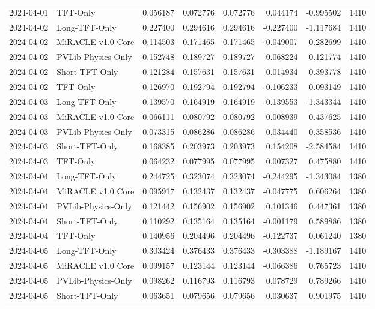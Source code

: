 \begin{tabular}{llrrrrrr}
2024-04-01 & TFT-Only & 0.056187 & 0.072776 & 0.072776 & 0.044174 & -0.995502 & 1410 \\
2024-04-02 & Long-TFT-Only & 0.227400 & 0.294616 & 0.294616 & -0.227400 & -1.117684 & 1410 \\
2024-04-02 & MiRACLE v1.0 Core & 0.114503 & 0.171465 & 0.171465 & -0.049007 & 0.282699 & 1410 \\
2024-04-02 & PVLib-Physics-Only & 0.152748 & 0.189727 & 0.189727 & 0.068224 & 0.121774 & 1410 \\
2024-04-02 & Short-TFT-Only & 0.121284 & 0.157631 & 0.157631 & 0.014934 & 0.393778 & 1410 \\
2024-04-02 & TFT-Only & 0.126970 & 0.192794 & 0.192794 & -0.106233 & 0.093149 & 1410 \\
2024-04-03 & Long-TFT-Only & 0.139570 & 0.164919 & 0.164919 & -0.139553 & -1.343344 & 1410 \\
2024-04-03 & MiRACLE v1.0 Core & 0.066111 & 0.080792 & 0.080792 & 0.008939 & 0.437625 & 1410 \\
2024-04-03 & PVLib-Physics-Only & 0.073315 & 0.086286 & 0.086286 & 0.034440 & 0.358536 & 1410 \\
2024-04-03 & Short-TFT-Only & 0.168385 & 0.203973 & 0.203973 & 0.154208 & -2.584584 & 1410 \\
2024-04-03 & TFT-Only & 0.064232 & 0.077995 & 0.077995 & 0.007327 & 0.475880 & 1410 \\
2024-04-04 & Long-TFT-Only & 0.244725 & 0.323074 & 0.323074 & -0.244295 & -1.343084 & 1380 \\
2024-04-04 & MiRACLE v1.0 Core & 0.095917 & 0.132437 & 0.132437 & -0.047775 & 0.606264 & 1380 \\
2024-04-04 & PVLib-Physics-Only & 0.121442 & 0.156902 & 0.156902 & 0.101346 & 0.447361 & 1380 \\
2024-04-04 & Short-TFT-Only & 0.110292 & 0.135164 & 0.135164 & -0.001179 & 0.589886 & 1380 \\
2024-04-04 & TFT-Only & 0.140956 & 0.204496 & 0.204496 & -0.122737 & 0.061240 & 1380 \\
2024-04-05 & Long-TFT-Only & 0.303424 & 0.376433 & 0.376433 & -0.303388 & -1.189167 & 1410 \\
2024-04-05 & MiRACLE v1.0 Core & 0.099157 & 0.123144 & 0.123144 & -0.066386 & 0.765723 & 1410 \\
2024-04-05 & PVLib-Physics-Only & 0.098262 & 0.116793 & 0.116793 & 0.078729 & 0.789266 & 1410 \\
2024-04-05 & Short-TFT-Only & 0.063651 & 0.079656 & 0.079656 & 0.030637 & 0.901975 & 1410 \\

\end{tabular}
